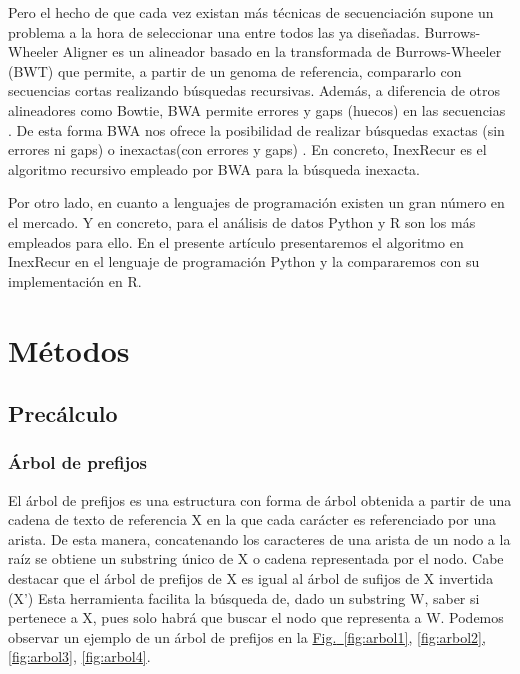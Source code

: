\documentclass{article}
\begin{document}
Pero el hecho de que cada vez existan más  técnicas  de  secuenciación
supone un problema a la hora de seleccionar una  entre	todos  las  ya
diseñadas.  Burrows-Wheeler Aligner  es  un  alineador	basado	en  la
transformada de Burrows-Wheeler (BWT) que  permite,  a	partir	de  un
genoma de referencia,  compararlo  con	secuencias  cortas  realizando
búsquedas recursivas.  Además, a diferencia de otros alineadores  como
Bowtie,  BWA  permite  errores	y  gaps  (huecos)  en  las  secuencias
\cite{gimenez_2016}.  De esta forma BWA nos ofrece la  posibilidad  de
realizar búsquedas exactas  (sin  errores  ni  gaps)  o  inexactas(con
errores y gaps)  \cite{gomez_2020}.   En  concreto,  InexRecur	es  el
algoritmo recursivo  empleado  por  BWA  para  la  búsqueda  inexacta.

Por otro lado, en cuanto a lenguajes de programación existen  un  gran
número en el mercado.  Y en concreto, para el análisis de datos Python
y R son  los  más  empleados  para  ello.   En	el  presente  artículo
presentaremos el algoritmo en InexRecur en el lenguaje de programación
Python	 y   la   compararemos	 con   su   implementación    en    R.

\section{Métodos}
\subsection{Precálculo}
\subsubsection{Árbol de prefijos}

El árbol de prefijos es una estructura con forma de árbol  obtenida  a
partir de una cadena de texto de referencia X en la que cada  carácter
es referenciado por una arista.   De  esta  manera,  concatenando  los
caracteres de una arista de un nodo a la raíz se obtiene un  substring
único de X o cadena representada por el nodo.  Cabe  destacar  que  el
árbol de prefijos de X es igual al árbol de  sufijos  de  X  invertida
(X’) Esta herramienta facilita la búsqueda de, dado  un  substring  W,
saber si pertenece a X,  pues  solo  habrá  que  buscar  el  nodo  que
representa a W.  Podemos observar un ejemplo de un árbol  de  prefijos
en la \hyperref[fig:arbol1]{{Fig.}~\ref*{fig:arbol1},}
\hyperref[fig:arbol2]{\ref*{fig:arbol2},}
\hyperref[fig:arbol3]{\ref*{fig:arbol3},}
\hyperref[fig:arbol4]{\ref*{fig:arbol4}}.
\end{document}
